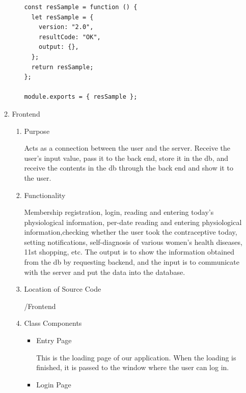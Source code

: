 \documentclass[conference]{IEEEtran}
\begin{document}
\begin{itemize}
\begin{enumerate}
\begin{enumerate}

            \begin{lstlisting}
const resSample = function () {
  let resSample = {
    version: "2.0",
    resultCode: "OK",
    output: {},
  };
  return resSample;
};

module.exports = { resSample };

            \end{lstlisting}

        \end{enumerate}
        \item Frontend
        \begin{enumerate}
            \item Purpose
            
           \setlength{\parindent}{2ex} Acts as a connection between the user and the server. Receive the user's input value, pass it to the back end, store it in the db, and receive the contents in the db through the back end and show it to the user.
            \item Functionality
            
            \setlength{\parindent}{2ex} Membership registration, login, reading and entering today's physiological information, per-date reading and entering physiological information,checking whether the user took the contraceptive today, setting notifications, self-diagnosis of various women's health diseases, 11st shopping, etc. The output is to show the information obtained from the db by requesting backend, and the input is to communicate with the server and put the data into the database.
            \item Location of Source Code
            
            /Frontend
            \item Class Components
            
            \begin{itemize}
                \item Entry Page
            
                \setlength{\parindent}{2ex} This is the loading page of our application. When the loading is finished, it is passed to the window where the user can log in.
                \item Login Page
            

\end{itemize}
\end{enumerate}
\end{enumerate}
\end{itemize}
\end{document}

